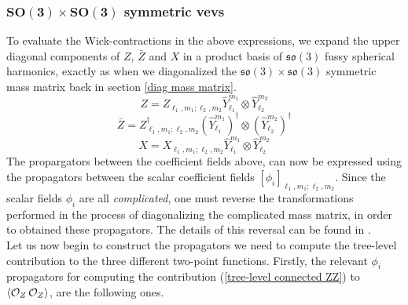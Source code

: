 \subsubsection[$SO(3) \times SO(3)$ symmetric vevs]{$\mathbf{SO(3) \times SO(3)}$ symmetric vevs}
To evaluate the Wick-contractions in the above expressions, we expand the upper diagonal components of $Z$, $\bar{Z}$ and $X$ in a product basis of $\mathfrak{so}(3)$ fussy spherical harmonics, exactly as when we diagonalized the $\mathfrak{so}(3) \times \mathfrak{so}(3)$ symmetric mass matrix back in section \ref{diag mass matrix}.
%
%
\begin{equation}\label{fuzzy harmonic coefficients Z}
Z = Z_{\ell_1,m_1;\ell_2,m_2}
\hat{Y}_{\ell_1}^{m_1} \otimes \hat{Y}_{\ell_2}^{m_2}
\end{equation}
%
%
\begin{equation}\label{fuzzy harmonic coefficients Z bar}
\bar{Z} = Z^\dagger_{\ell_1,m_1;\ell_2,m_2}
(\hat{Y}_{\ell_1}^{m_1})^{\dagger} \otimes (\hat{Y}_{\ell_2}^{m_2})^\dagger
\end{equation}
%
%
\begin{equation}\label{fuzzy harmonic coefficients X}
X = X_{\ell_1,m_1;\ell_2,m_2}
\hat{Y}_{\ell_1}^{m_1} \otimes \hat{Y}_{\ell_2}^{m_2}
\end{equation}
%
%
The propargators between the coefficient fields above, can now be expressed using the propagators between the scalar coefficient fields $[\phi_i]_{\ell_1,m_1;\ell_2,m_2}$. Since the scalar fields $\phi_i$ are all \textit{complicated}, one must reverse the transformations performed in the process of diagonalizing the complicated mass matrix, in order to obtained these propagators. The details of this reversal can be found in \cite{One-point functions in D3-D7}.\\
Let us now begin to construct the propagators we need to compute the tree-level contribution to the three different two-point functions. Firstly, the relevant $\phi_i$ propagators for computing the contribution (\ref{tree-level connected ZZ}) to $\expval{\mathcal{O}_{Z} \, \mathcal{O}_{Z}}$, are the following ones.
